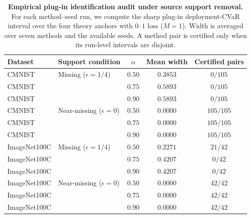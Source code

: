 \begin{table}[t]
\centering
\small
\caption{\textbf{Empirical plug-in identification audit under source support removal.} For each method--seed run, we compute the sharp plug-in deployment-CVaR interval over the four theory anchors with $0$--$1$ loss ($M=1$). Width is averaged over seven methods and the available seeds. A method pair is certified only when its run-level intervals are disjoint.}
\label{tab:identification-audit}
\begin{tabular}{@{}llccc@{}}
\toprule
Dataset & Support condition & $\alpha$ & Mean width & Certified pairs \\
\midrule
CMNIST & Missing ($\epsilon=1/4$)
  & $0.50$ & $0.3853$ & $0/105$ \\
CMNIST &
  & $0.75$ & $0.5893$ & $0/105$ \\
CMNIST &
  & $0.90$ & $0.5893$ & $0/105$ \\
\addlinespace
CMNIST & Near-missing ($\epsilon=0$)
  & $0.50$ & $0.0000$ & $105/105$ \\
CMNIST &
  & $0.75$ & $0.0000$ & $105/105$ \\
CMNIST &
  & $0.90$ & $0.0000$ & $105/105$ \\
\addlinespace
ImageNet100C & Missing ($\epsilon=1/4$)
  & $0.50$ & $0.2271$ & $21/42$ \\
ImageNet100C &
  & $0.75$ & $0.4207$ & $0/42$ \\
ImageNet100C &
  & $0.90$ & $0.4207$ & $0/42$ \\
ImageNet100C & Near-missing ($\epsilon=0$)
  & $0.50$ & $0.0000$ & $42/42$ \\
ImageNet100C &
  & $0.75$ & $0.0000$ & $42/42$ \\
ImageNet100C &
  & $0.90$ & $0.0000$ & $42/42$ \\
\bottomrule
\end{tabular}
\end{table}
